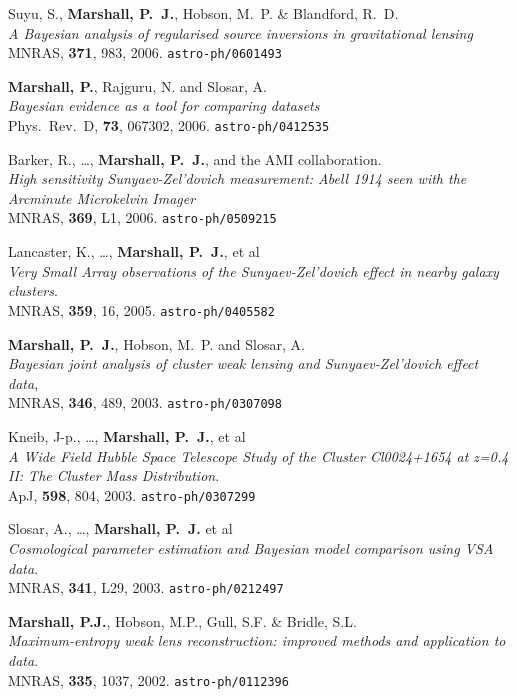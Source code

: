 \begin{revnumerate}
\item{Suyu, S., \textbf{{Marshall}, P.~J.}, Hobson, M.~P. \& Blandford, R.~D.\\
\textit{A Bayesian analysis of regularised source inversions in gravitational lensing}\\
MNRAS, \textbf{371}, 983, 2006.
\texttt{astro-ph/0601493}
}

\item{\textbf{{Marshall}, P.}, {Rajguru}, N. and {Slosar}, A.\\
\textit{Bayesian evidence as a tool for comparing datasets}\\
Phys.~Rev.~D, \textbf{73}, 067302, 2006.
\texttt{astro-ph/0412535}
}

\item{Barker, R., \ldots, \textbf{{Marshall}, P.~J.}, and the AMI collaboration.\\
\textit{High sensitivity Sunyaev-Zel'dovich measurement: Abell 1914 seen with the Arcminute Microkelvin Imager}\\
MNRAS, \textbf{369}, L1, 2006.
\texttt{astro-ph/0509215}
}

\item{{Lancaster}, K., \ldots, \textbf{{Marshall}, P.~J.}, et al \\
\textit{Very Small Array observations of the Sunyaev-Zel'dovich effect in nearby galaxy clusters}.\\
MNRAS, \textbf{359}, 16, 2005.
\texttt{astro-ph/0405582}
}

\item{\textbf{{Marshall}, P.~J.}, {Hobson}, M.~P. and {Slosar}, A.\\
\textit{Bayesian joint analysis of cluster weak lensing and Sunyaev-Zel'dovich effect data},\\
MNRAS, \textbf{346}, 489, 2003.
\texttt{astro-ph/0307098}
}

\item{{Kneib}, J-p.,  \ldots, \textbf{{Marshall}, P.~J.}, et al\\
\textit{A Wide Field Hubble Space Telescope Study of the Cluster Cl0024+1654 at z=0.4 II: The Cluster Mass Distribution}.\\
ApJ, \textbf{598}, 804, 2003.
\texttt{astro-ph/0307299}
}

\item{{Slosar}, A., \ldots, \textbf{{Marshall}, P.~J.} et al\\
\textit{Cosmological parameter estimation and Bayesian model comparison using VSA data}.\\
MNRAS, \textbf{341}, L29, 2003.
\texttt{astro-ph/0212497}
}

\item{\textbf{Marshall, P.J.}, Hobson, M.P., Gull, S.F. \& Bridle, S.L.\\
\textit{Maximum-entropy weak lens reconstruction: improved methods and application to data}.\\
MNRAS, \textbf{335}, 1037, 2002.
\texttt{astro-ph/0112396}
}

\end{revnumerate}

